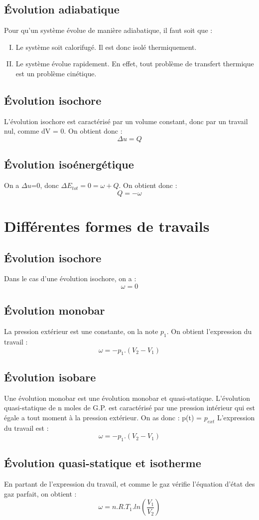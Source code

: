\subsection{Évolution adiabatique}
Pour qu'un système évolue de manière adiabatique, il faut soit que : 
\begin{enumerate}[I) ]
 \item Le système soit calorifugé. Il est donc isolé thermiquement.
 \item Le système évolue rapidement. En effet, tout problème de transfert thermique est un problème cinétique. 
\end{enumerate}
\subsection{Évolution isochore}
L'évolution isochore est caractérisé par un volume constant, donc par un travail nul, comme dV = 0. On obtient donc :
$$\Delta u = Q$$ 
\subsection{Évolution isoénergétique}
On a $\Delta u$=0, donc $\Delta E_{tot}=0=\omega+Q$. On obtient donc :
$$Q = -\omega$$
\section{Différentes formes de travails}
\subsection{Évolution isochore}
Dans le cas d'une évolution isochore, on a : 
$$\omega = 0$$
\subsection{Évolution monobar}
La pression extérieur est une constante, on la note $p_1$.
On obtient l'expression du travail : 
$$\omega = -p_1.(V_2-V_1)$$
\subsection{Évolution isobare}
Une évolution monobar est une évolution monobar et quasi-statique. L'évolution quasi-statique de n moles de G.P. est caractérisé par une pression intérieur qui est égale a tout moment à la pression extérieur. On as donc : p(t) = $p_{ext}$
L'expression du travail est : 
$$\omega = -p_1.(V_2-V_1)$$
\subsection{Évolution quasi-statique et isotherme}
En partant de l'expression du travail, et comme le gaz vérifie l'équation d'état des gaz parfait, on obtient : 
$$\omega = n.R.T_1.ln(\dfrac{V_1}{V_2})$$
